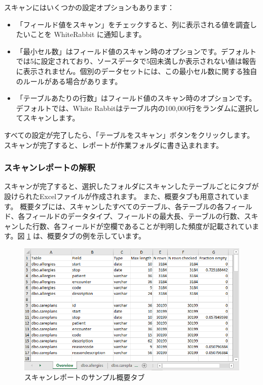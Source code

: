 \documentclass[
  11pt]{book}
\providecommand{\tightlist}{%
  \setlength{\itemsep}{0pt}\setlength{\parskip}{0pt}}
\theoremstyle{definition}
\theoremstyle{definition}
\theoremstyle{definition}
\theoremstyle{definition}
\theoremstyle{remark}
\begin{document}
スキャンにはいくつかの設定オプションもあります：

\begin{itemize}
\tightlist
\item
  「フィールド値をスキャン」をチェックすると、列に表示される値を調査したいことを WhiteRabbit に通知します。
\item
  「最小セル数」はフィールド値のスキャン時のオプションです。デフォルトでは5に設定されており、ソースデータで5回未満しか表示されない値は報告に表示されません。個別のデータセットには、この最小セル数に関する独自のルールがある場合があります。
\item
  「テーブルあたりの行数」はフィールド値のスキャン時のオプションです。デフォルトでは、White Rabbitはテーブル内の100,000行をランダムに選択してスキャンします。
\end{itemize}

すべての設定が完了したら、「テーブルをスキャン」ボタンをクリックします。スキャンが完了すると、レポートが作業フォルダに書き込まれます。

\subsubsection*{スキャンレポートの解釈}\label{ux30b9ux30adux30e3ux30f3ux30ecux30ddux30fcux30c8ux306eux89e3ux91c8}

スキャンが完了すると、選択したフォルダにスキャンしたテーブルごとにタブが設けられたExcelファイルが作成されます。 また、概要タブも用意されています。 概要タブには、スキャンしたすべてのテーブル、各テーブルの各フィールド、各フィールドのデータタイプ、フィールドの最大長、テーブルの行数、スキャンした行数、各フィールドが空欄であることが判明した頻度が記載されています。図 \ref{fig:ScanOverviewTab} は、概要タブの例を示しています。

\begin{figure}

{\centering \includegraphics[width=1\linewidth]{images/ExtractTransformLoad/ScanOverviewTab} 

}

\caption{スキャンレポートのサンプル概要タブ}\label{fig:ScanOverviewTab}
\end{figure}
\end{document}
